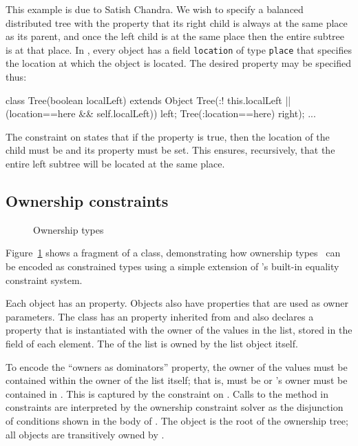This example is due to Satish Chandra. We wish to specify a balanced
distributed tree with the property that its right child is always at
the same place as its parent, and once the left child is at the same
place then the entire subtree is at that place.  In
\Xten{}, every object has a field {\tt location} of type
{\tt place} that specifies the location at which the object is located.
%
The desired property may be specified thus:
\begin{displayxten}
class Tree(boolean localLeft) extends Object {
  Tree(:! this.localLeft || (location==here && self.localLeft)) left; 
  Tree(:location==here) right);
  ...
}
\end{displayxten}
The constraint on  states that if
the  property is true, then the location 
of the  child must be  and its
 property must be set.
This ensures, recursively, that the entire
left subtree will be located at the same place.

\subsection{Ownership constraints}

\begin{figure}
\caption{Ownership types}
\label{fig:ownership}
\end{figure}

Figure~\ref{fig:ownership} shows a fragment of a  class, 
demonstrating how ownership
types~\cite{ownership-types} can be encoded as constrained
types using a simple extension of \Xten{}'s built-in equality
constraint system.

Each  object has an  property.
Objects also have properties that are used as owner parameters.
%
The  class has an  property inherited from
 and also declares a  property that is
instantiated with the owner of the values in the list, stored
in the  field of each element.
The  of the list is owned by the list object itself.

To encode the ``owners as dominators'' property, the owner of
the values  must be contained within the owner
of the list itself; that is,  must be 
or 's owner must be contained in .
This is captured by the constraint  on
.  Calls to the  method in constraints
are interpreted by the ownership constraint solver as the
disjunction of conditions shown in the body of .
The object  is the root of the ownership tree; 
all objects are transitively owned by .

